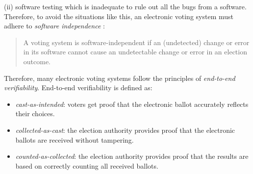 \documentclass[sigconf,anonymous,review]{acmart}
\begin{document}
(ii) software testing which is inadequate to rule out all the bugs 
from a software. Therefore, to avoid the situations like this, 
an electronic voting system must adhere to \textit{software independence} \cite{rivest2008notion}:
\begin{quote}
  A voting system is software-independent if an
  (undetected) change or error in its software cannot
  cause an undetectable change or error in an
  election outcome. 
\end{quote}
\noindent
Therefore, many electronic voting systems follow the principles 
of \textit{end-to-end verifiability}. End-to-end verifiability is 
defined as: 
\begin{itemize}
  \item \textit{cast-as-intended}: voters get proof that the electronic ballot accurately reflects their choices.
  \item \textit{collected-as-cast}: the election authority provides proof that the electronic ballots are received without tampering.
  \item \textit{counted-as-collected}: the election authority provides proof that the results are based on correctly counting all received ballots.
\end{itemize} 
\end{document}
